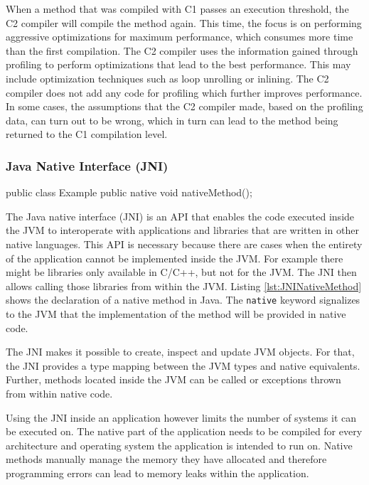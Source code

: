 When a method that was compiled with C1 passes an execution threshold, the C2 compiler will compile the method again. This time, the focus is on performing aggressive optimizations for maximum performance, which consumes more time than the first compilation. The C2 compiler uses the information gained through profiling to perform optimizations that lead to the best performance. This may include optimization techniques such as loop unrolling or inlining. The C2 compiler does not add any code for profiling which further improves performance. In some cases, the assumptions that the C2 compiler made, based on the profiling data, can turn out to be wrong, which in turn can lead to the method being returned to the C1 compilation level.

\subsubsection{Java Native Interface (JNI)}


\begin{JavaCode}[float,numbers=none,caption=Declaration of a native method in Java., label=lst:JNINativeMethod]
    public class Example {
        public native void nativeMethod();
    }
\end{JavaCode}


The Java native interface (JNI) is an API that enables the code executed inside the JVM to interoperate with applications and libraries that are written in other native languages. This API is necessary because there are cases when the entirety of the application cannot be implemented inside the JVM. For example there might be libraries only available in C/C++, but not for the JVM. The JNI then allows calling those libraries from within the JVM. Listing \ref{lst:JNINativeMethod} shows the declaration of a native method in Java. The \texttt{native} keyword signalizes to the JVM that the implementation of the method will be provided in native code.


The JNI makes it possible to create, inspect and update JVM objects. For that, the JNI provides a type mapping between the JVM types and native equivalents. Further, methods located inside the JVM can be called or exceptions thrown from within native code.

Using the JNI inside an application however limits the number of systems it can be executed on. The native part of the application needs to be compiled for every architecture and operating system the application is intended to run on. Native methods manually manage the memory they have allocated and therefore programming errors can lead to memory leaks within the application.  

